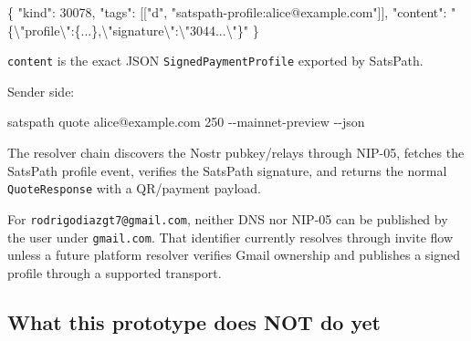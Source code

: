 \documentclass[
]{article}
\newenvironment{Shaded}{}{}
\newcommand{\AttributeTok}[1]{\textcolor[rgb]{0.49,0.56,0.16}{#1}}
\newcommand{\CharTok}[1]{\textcolor[rgb]{0.25,0.44,0.63}{#1}}
\newcommand{\DataTypeTok}[1]{\textcolor[rgb]{0.56,0.13,0.00}{#1}}
\newcommand{\DecValTok}[1]{\textcolor[rgb]{0.25,0.63,0.44}{#1}}
\newcommand{\ExtensionTok}[1]{#1}
\newcommand{\FunctionTok}[1]{\textcolor[rgb]{0.02,0.16,0.49}{#1}}
\newcommand{\NormalTok}[1]{#1}
\newcommand{\OtherTok}[1]{\textcolor[rgb]{0.00,0.44,0.13}{#1}}
\newcommand{\StringTok}[1]{\textcolor[rgb]{0.25,0.44,0.63}{#1}}
\begin{document}
\begin{Shaded}
\begin{Highlighting}[]
\FunctionTok{\{}
  \DataTypeTok{"kind"}\FunctionTok{:} \DecValTok{30078}\FunctionTok{,}
  \DataTypeTok{"tags"}\FunctionTok{:} \OtherTok{[[}\StringTok{"d"}\OtherTok{,} \StringTok{"satspath{-}profile:alice@example.com"}\OtherTok{]]}\FunctionTok{,}
  \DataTypeTok{"content"}\FunctionTok{:} \StringTok{"\{}\CharTok{\textbackslash{}"}\StringTok{profile}\CharTok{\textbackslash{}"}\StringTok{:\{...\},}\CharTok{\textbackslash{}"}\StringTok{signature}\CharTok{\textbackslash{}"}\StringTok{:}\CharTok{\textbackslash{}"}\StringTok{3044...}\CharTok{\textbackslash{}"}\StringTok{\}"}
\FunctionTok{\}}
\end{Highlighting}
\end{Shaded}

\texttt{content} is the exact JSON \texttt{SignedPaymentProfile}
exported by SatsPath.

Sender side:

\begin{Shaded}
\begin{Highlighting}[]
\ExtensionTok{satspath}\NormalTok{ quote alice@example.com 250 }\AttributeTok{{-}{-}mainnet{-}preview} \AttributeTok{{-}{-}json}
\end{Highlighting}
\end{Shaded}

The resolver chain discovers the Nostr pubkey/relays through NIP-05,
fetches the SatsPath profile event, verifies the SatsPath signature, and
returns the normal \texttt{QuoteResponse} with a QR/payment payload.

For \texttt{rodrigodiazgt7@gmail.com}, neither DNS nor NIP-05 can be
published by the user under \texttt{gmail.com}. That identifier
currently resolves through invite flow unless a future platform resolver
verifies Gmail ownership and publishes a signed profile through a
supported transport.

\hypertarget{what-this-prototype-does-not-do-yet}{%
\subsection{What this prototype does NOT do
yet}\label{what-this-prototype-does-not-do-yet}}
\end{document}
